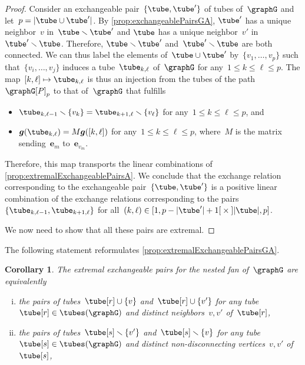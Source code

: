 \documentclass{amsart}
\newtheorem{corollary}[theorem]{Corollary}
\theoremstyle{definition}
\renewcommand{\b}[1]{{\boldsymbol{#1}}} %
\newcommand{\ssm}{\smallsetminus} %
\newcommand{\vincent}[1]{\todo[color=blue!30]{#1 \\ \hfill --- V.}}
\newcommand{\gvector}[1]{\b{g}(#1)} %
\begin{document}
\begin{proof}
Consider an exchangeable pair~$\{\tube, \tube'\}$ of tubes of~$\graphG$ and let~$p = |\tube \cup \tube'|$.
By \cref{prop:exchangeablePairsGA}, $\tube'$ has a unique neighbor~$v$ in~$\tube \ssm \tube'$ and $\tube$ has a unique neighbor~$v'$ in~$\tube' \ssm \tube$.
Therefore, $\tube \ssm \tube'$ and~$\tube' \ssm \tube$ are both connected.
We can thus label the elements of~$\tube \cup \tube'$ by~$\{v_1, \dots, v_p\}$ such that~$\{v_i, \dots, v_j\}$ induces a tube~$\tube_{k,\ell}$ of~$\graphG$ for any~$1 \le k \le \ell \le p$. 
The map~$[k,\ell] \mapsto \tube_{k,\ell}$ is thus an injection from the tubes of the path~$\graphG[P]_p$ to that of~$\graphG$ that fulfills
\begin{itemize}
\item $\tube_{k,\ell-1} \ssm \{v_k\} = \tube_{k+1,\ell} \ssm \{v_\ell\}$ for any~$1 \le k \le \ell \le p$, and
\item $\gvector{\tube_{k,\ell}} = M\gvector{[k,\ell]}$ for any~$1 \le k \le \ell \le p$, where~$M$ is the matrix sending~$\b{e}_m$ to~$\b{e}_{v_m}$.
\end{itemize}
Therefore, this map transports the linear combinations of \cref{prop:extremalExchangeablePairsA}.
We conclude that the exchange relation corresponding to the exchangeable pair~$\{\tube, \tube'\}$ is a positive linear combination of the exchange relations corresponding to the pairs~$\{\tube_{k,\ell-1}, \tube_{k+1,\ell}\}$ for all~${(k,\ell) \in {[1, p-|\tube'|+1[} \times {]|\tube|, p]}}$.

We now need to show that all these pairs are extremal.
\vincent{TODO}
\end{proof}

The following statement reformulates \cref{prop:extremalExchangeablePairsGA}.

\begin{corollary}
\label{coro:extremalExchangeablePairsGA}
The extremal exchangeable pairs for the nested fan of~$\graphG$ are equivalently
\begin{enumerate}[(i)]
\item the pairs of tubes~$\tube[r] \cup \{v\}$ and~$\tube[r] \cup \{v'\}$ for any tube~$\tube[r] \in \tubes(\graphG)$ and distinct neighbors~$v,v'$ of~$\tube[r]$,
\item the pairs of tubes~$\tube[s] \ssm \{v'\}$ and~$\tube[s] \ssm \{v\}$ for any tube~$\tube[s] \in \tubes(\graphG)$ and distinct non-disconnecting vertices~$v,v'$ of~$\tube[s]$,
\end{enumerate}
\end{corollary}
\end{document}
